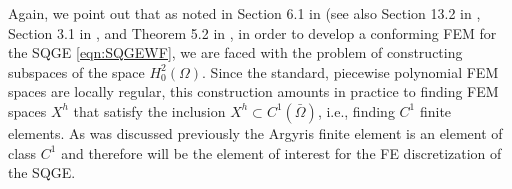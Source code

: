 Again, we point out that as noted in Section 6.1 in \cite{Ciarlet} (see also Section 13.2 in
\cite{Gunzburger89}, Section 3.1 in \cite{Johnson}, and Theorem 5.2 in \cite{Braess}, in order to
develop a conforming FEM for the SQGE \eqref{eqn:SQGEWF}, we are faced with the problem of
constructing subspaces of the space $H^2_0(\Omega)$. Since the standard, piecewise polynomial FEM
spaces are locally regular, this construction amounts in practice to finding FEM spaces $X^h$ that
satisfy the inclusion $X^h \subset C^1({\bar \Omega})$, i.e., finding $C^1$ finite elements. As was
discussed previously the Argyris finite element is an element of class $C^1$ and therefore will be
the element of interest for the FE discretization of the SQGE.

